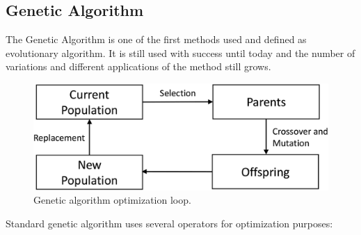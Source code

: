 \documentclass[12pt,a4paper,openany]{book}
\begin{document}
\subsection{Genetic Algorithm}


The Genetic Algorithm is one of the first methods used and defined as evolutionary algorithm. It is still used with success until today and the number of variations and different applications of the method still grows.

 \begin{figure}[ht!]
     \centering
     \includegraphics[scale=0.22]{figs/gen-algo.eps}
     \caption{Genetic algorithm optimization loop.}\label{Fig:PROGAN}
 \end{figure}


\noindent Standard genetic algorithm uses several operators for optimization purposes:




\end{document}
